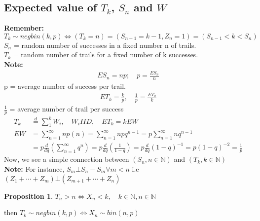 \documentclass{article}
\theoremstyle{definition}
\theoremstyle{thrm}
\theoremstyle{lma}
\theoremstyle{ppst}
\newtheorem{ppst}{Proposition}[section]
\theoremstyle{crlr}
\begin{document}
\subsection{Expected value of $T_k$, $S_n$ and $W$}
\textbf{Remember:} $T_k \sim negbin(k,p) \iff (T_k=n)=(S_{n-1}=k-1,Z_n=1) = (S_{n-1}<k<S_n)$\\
$S_n$ = random number of successes in a fixed number n of trails.\\
$T_k$ = random number of trails for a fixed number of k successes.\\
\textbf{Note:} 
\begin{align*}
	ES_n = np;\quad  p=\frac{ES_n}{n}
\end{align*}
p = average number of success per trail.\\
\begin{align*}
	ET_k = \frac{k}{p}, \quad \frac{1}{p} = \frac{ET_k}{k}
\end{align*}
$\frac{1}{p}$ = average number of trail per success
\begin{align*}
	T_k&\stackrel{d}{=}\sum_1^kW_i,\quad W_i IID,\quad ET_k = kEW\\
	EW &=\sum_{n=1}^\infty np(n) = \sum_{n=1}^\infty npq^{n-1} = p\sum_{n=1}^\infty nq^{n-1}\\
	&= p \frac{d}{dq}(\sum_{n=1}^\infty q^n) = p\frac{d}{dq}(\frac{1}{1-q}) = p\frac{d}{dq}(1-q)^{-1} = p(1-q)^{-2} = \frac{1}{p}
\end{align*}
Now, we see a simple connection between $(S_n, n\in \mathbb{N})$ and $(T_k, k\in \mathbb{N})$\\
\textbf{Note:} For instance, $S_m\bot S_n-S_m \forall m<n$ i.e $(Z_1+\cdots+Z_m) \bot (Z_{m+1}+\cdots+Z_n)$
\begin{ppst}
	$T_n>n \iff X_n<k,\quad k\in \mathbb{N},n\in\mathbb{N}$
\end{ppst}
then $T_k\sim negbin(k,p) \iff X_n \sim bin(n,p)$
\end{document}
